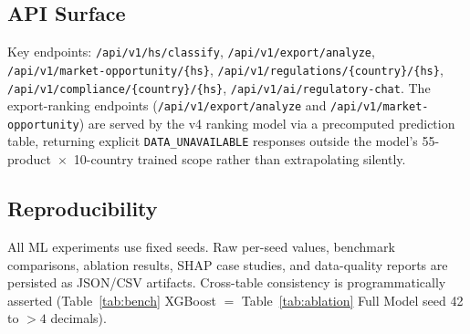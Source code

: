 \documentclass[conference]{IEEEtran}
\begin{document}
\subsection{API Surface}
Key endpoints: \texttt{/api/v1/hs/classify},
\texttt{/api/v1/export/analyze},
\texttt{/api/v1/market-opportunity/\{hs\}},
\texttt{/api/v1/regulations/\{country\}/\{hs\}},
\texttt{/api/v1/compliance/\{country\}/\{hs\}},
\texttt{/api/v1/ai/regulatory-chat}. The export-ranking endpoints
(\texttt{/api/v1/export/analyze} and
\texttt{/api/v1/market-opportunity}) are served by the v4 ranking model via
a precomputed prediction table, returning explicit \texttt{DATA\_UNAVAILABLE}
responses outside the model's 55-product~$\times$~10-country trained scope
rather than extrapolating silently.

\subsection{Reproducibility}
All ML experiments use fixed seeds. Raw per-seed values, benchmark
comparisons, ablation results, SHAP case studies, and data-quality reports
are persisted as JSON/CSV artifacts. Cross-table consistency is
programmatically asserted (Table~\ref{tab:bench} XGBoost $=$
Table~\ref{tab:ablation} Full Model seed 42 to $>4$ decimals).

\end{document}
